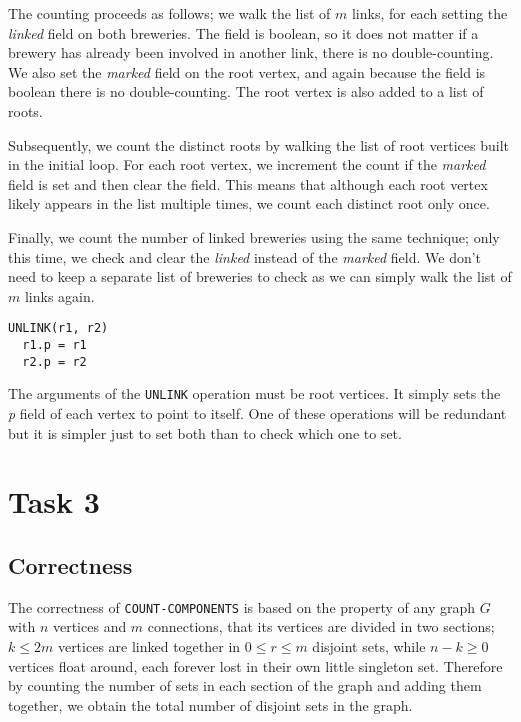 \documentclass[paper=a4, fleqn]{article}
\begin{document}
The counting proceeds as follows; we walk the list of $m$ links, for each
setting the {\em linked} field on both breweries. The field is boolean, so it
does not matter if a brewery has already been involved in another link, there is
no double-counting. We also set the {\em marked} field on the root vertex, and
again because the field is boolean there is no double-counting. The root vertex
is also added to a list of roots.

Subsequently, we count the distinct roots by walking the list of root vertices
built in the initial loop. For each root vertex, we increment the count if the
{\em marked} field is set and then clear the field. This means that although
each root vertex likely appears in the list multiple times, we count each
distinct root only once.

Finally, we count the number of linked breweries using the same technique; only
this time, we check and clear the {\em linked} instead of the {\em marked}
field. We don't need to keep a separate list of breweries to check as we can
simply walk the list of $m$ links again.

\begin{lstlisting}
UNLINK(r1, r2)
  r1.p = r1
  r2.p = r2
\end{lstlisting}
The arguments of the {\tt UNLINK} operation must be root vertices. It simply
sets the {\em p} field of each vertex to point to itself. One of these
operations will be redundant but it is simpler just to set both than to check
which one to set.

\section*{Task 3}

\subsection*{Correctness}

The correctness of {\tt COUNT-COMPONENTS} is based on the property of any graph
$G$ with $n$ vertices and $m$ connections, that its vertices are divided in two
sections; $k\leq 2m$ vertices are linked together in $0\leq r\leq m$ disjoint
sets, while $n-k\geq 0$ vertices float around, each forever lost in their own
little singleton set. Therefore by counting the number of sets in each section
of the graph and adding them together, we obtain the total number of disjoint
sets in the graph.
\end{document}
